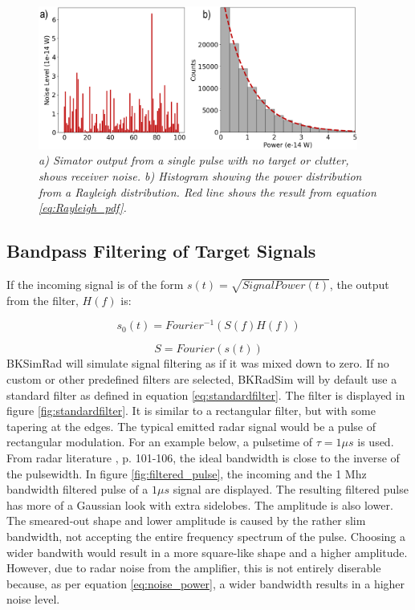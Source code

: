 \documentclass[letterpaper]{book}
\begin{document}
\begin{figure}
  \includegraphics[width=10.5cm]{noise_rayleigh.png}
  \caption{\textit{a) Simator output from a single pulse with no target or clutter, shows receiver noise. b) Histogram showing the power distribution from a Rayleigh distribution. Red line shows the result from equation \ref{eq:Rayleigh_pdf}.}}
  \label{fig:beam_deviation}
\end{figure}

\subsection{Bandpass Filtering of Target Signals}
If the incoming signal is of the form \(s(t)=\sqrt{SignalPower(t)}\), the output from the filter, \(H(f)\) is:

\begin{equation} \label{eq:signal_reception_0}
s_{0}(t) = Fourier^{-1}(S(f)H(f))
\end{equation}

\begin{equation} \label{eq:signal_reception_1}
S = Fourier(s(t))
\end{equation}
BKSimRad will simulate signal filtering as if it was mixed down to zero. If no custom or other predefined filters are selected, BKRadSim will by default use a standard filter as defined in equation \ref{eq:standardfilter}. The filter is displayed in figure \ref{fig:standardfilter}. It is similar to a rectangular filter, but with some tapering at the edges. The typical emitted radar signal would be a pulse of rectangular modulation. For an example below, a pulsetime of \(\tau=1\mu s\) is used. From radar literature  \cite{ref:levanon}, p. 101-106, the ideal bandwidth is close to the inverse of the pulsewidth. In figure \ref{fig:filtered_pulse}, the incoming and the 1 Mhz bandwidth filtered pulse of a \(1\mu s\) signal are displayed. 
The resulting filtered pulse has more of a Gaussian look with extra sidelobes. The amplitude is also lower. The smeared-out shape and lower amplitude is caused by the rather slim bandwidth, not accepting the entire frequency spectrum of the pulse. Choosing a wider bandwith would result in a more square-like shape and a higher amplitude. However, due to radar noise from the amplifier, this is not entirely diserable because, as per equation \ref{eq:noise_power}, a wider bandwidth results in a higher noise level. 
\end{document}
